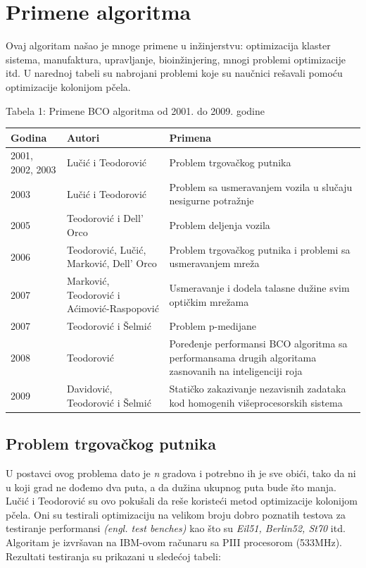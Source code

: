 \documentclass[a4paper]{article}
\begin{document}
{\section{Primene algoritma}
Ovaj algoritam našao je mnoge primene u inžinjerstvu: optimizacija klaster sistema, manufaktura, upravljanje, bioinžinjering, mnogi problemi optimizacije itd.
U narednoj tabeli su nabrojani problemi koje su naučnici rešavali pomoću optimizacije kolonijom pčela.

\begin{center}
Tabela 1: Primene BCO algoritma od 2001. do 2009. godine
\begin{tabular}{|p{1cm}|p{3cm}|p{5cm}|}
 \hline
Godina & Autori & Primena \\ \hline
2001, 2002, 2003&Lučić i Teodorović&Problem trgovačkog putnika\\ \hline
2003&Lučić i Teodorović&Problem sa usmeravanjem vozila u slučaju nesigurne potražnje\\ \hline
2005&Teodorović i Dell’ Orco&Problem deljenja vozila\\ \hline
2006&Teodorović, Lučić, Marković, Dell’ Orco & Problem trgovačkog putnika i problemi sa usmeravanjem mreža\\ \hline
2007&Marković, Teodorović i Aćimović-Raspopović & Usmeravanje i dodela talasne dužine svim optičkim mrežama\\ \hline
2007& Teodorović i Šelmić & Problem p-medijane\\ \hline
2008& Teodorović & Poređenje performansi BCO algoritma sa performansama drugih algoritama zasnovanih na inteligenciji roja\\ \hline
2009& Davidović, Teodorović i Šelmić & Statičko zakazivanje nezavisnih zadataka kod homogenih višeprocesorskih sistema\\ \hline
\end{tabular}\par
\bigskip
\end{center}

\subsection{Problem trgovačkog putnika}
\label{subsec:prvaprimena}
U postavci ovog problema dato je {\em n} gradova i potrebno ih je sve obići, tako da ni u koji grad ne dođemo dva puta, a da dužina ukupnog puta bude što manja. Lučić i Teodorović su ovo pokušali da reše koristeći metod optimizacije kolonijom pčela. Oni su testirali optimizaciju na velikom broju dobro poznatih testova za testiranje performansi {\em (engl. test benches)} kao što su {\em Eil51, Berlin52, St70} itd\cite{test}. Algoritam je izvršavan na IBM-ovom računaru sa PIII procesorom (533MHz). Rezultati testiranja su prikazani u sledećoj tabeli: 

}
\end{document}
